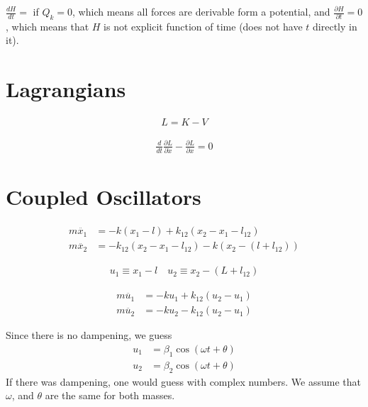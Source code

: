 \documentclass[10pt]{amsart}
\begin{document}
\begin{multicols}{2}
  $\frac{d H}{dt}=$ if $Q_k=0$, which means all forces are derivable form a
  potential, and $\frac{\partial H}{\partial t}=0$, which means that $H$ is not
  explicit function of time (does not have $t$ directly in it).

  \section{Lagrangians}%
  \label{sec:lagrangians}

  \begin{align*}
     L=K-V
  \end{align*}
  
  \begin{align*}
    \frac{d}{dt}\frac{\partial L}{\partial \dot{x}}-\frac{\partial L}{\partial
    x}=0
  \end{align*}

  \section{Coupled Oscillators}%
  \label{sec:coupled_oscillators}
  
  \begin{align*}
    m\ddot{x_1}&=-k(x_1-l)+k_{12}(x_2-x_1-l_{12})\\
    m\ddot{x_2}&=-k_{12}(x_2-x_1-l_{12})-k(x_2-(l+l_12))
  \end{align*}

  \begin{align*}
    u_1\equiv x_1-l\quad u_2\equiv x_2-(L+l_{12})
  \end{align*}

  \begin{align*}
    m\ddot{u_1}&=-ku_1+k_{12}(u_2-u_1)\\
    m\ddot{u_2}&=-ku_2-k_{12}(u_2-u_1)
  \end{align*}

  Since there is no dampening, we guess
  \begin{align*}
    u_1&=\beta_1\cos(\omega t+\theta)\\
    u_2&=\beta_2\cos(\omega t+\theta)
  \end{align*}
  If there was dampening, one would guess with complex numbers. We assume that
  $\omega$, and $\theta$ are the same for both masses.


\end{multicols}
\end{document}

